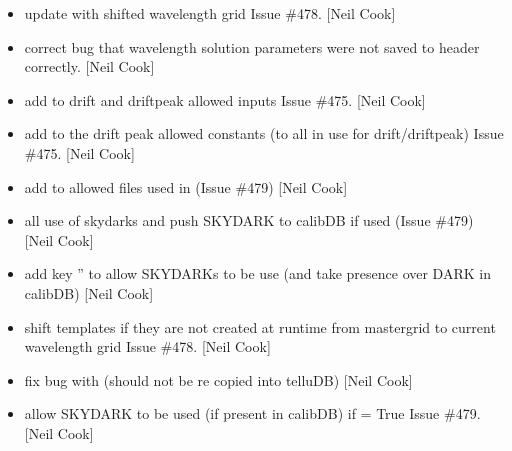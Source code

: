 \documentclass[a4paper,10pt,english]{report}
\begin{document}
\begin{itemize}
\item {} 
 \sphinxhyphen{} update with shifted wavelength grid \sphinxhyphen{} Issue
\#478. {[}Neil Cook{]}

\item {} 
 \sphinxhyphen{} correct bug that wavelength solution
parameters were not saved to header correctly. {[}Neil Cook{]}

\item {} 
 \sphinxhyphen{} add  to drift and driftpeak allowed inputs
\sphinxhyphen{} Issue \#475. {[}Neil Cook{]}

\item {} 
 \sphinxhyphen{} add  to the drift peak allowed
constants (to all in use for drift/driftpeak) \sphinxhyphen{} Issue \#475. {[}Neil
Cook{]}

\item {} 
 \sphinxhyphen{} add  to allowed files used in
 (Issue \#479) {[}Neil Cook{]}

\item {} 
 \sphinxhyphen{} all use of skydarks and push SKYDARK to calibDB
if used (Issue \#479) {[}Neil Cook{]}

\item {} 
 \sphinxhyphen{} add key ” to allow
SKYDARKs to be use (and take presence over DARK in calibDB) {[}Neil
Cook{]}

\item {} 
 \sphinxhyphen{} shift templates if they are not created at runtime
from mastergrid to current wavelength grid \sphinxhyphen{} Issue \#478. {[}Neil Cook{]}

\item {} 
 \sphinxhyphen{} fix bug with  (should not be re\sphinxhyphen{}
copied into telluDB) {[}Neil Cook{]}

\item {} 
 \sphinxhyphen{} allow SKYDARK to be used (if present in calibDB) if
 = True \sphinxhyphen{} Issue \#479. {[}Neil Cook{]}


\end{itemize}
\end{document}
